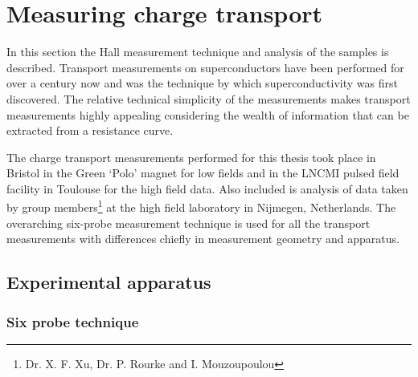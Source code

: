 
\section{Measuring charge transport}

In this section the Hall measurement technique and analysis of the \BSCO samples is described. Transport measurements on superconductors have been performed for over a century now and was the technique by which superconductivity was first discovered. The relative technical simplicity of the measurements makes transport measurements highly appealing considering the wealth of information that can be extracted from a resistance curve.

The charge transport measurements performed for this thesis took place in Bristol in the Green `Polo' magnet for low fields and in the LNCMI pulsed field facility in Toulouse for the high field data. Also included is analysis of data taken by group members\footnote{Dr. X. F. Xu, Dr. P. Rourke and I. Mouzoupoulou} at the high field laboratory in Nijmegen, Netherlands. The overarching six-probe measurement technique is used for all the transport measurements with differences chiefly in measurement geometry and apparatus.

\subsection{Experimental apparatus}

\subsubsection{Six probe technique}

